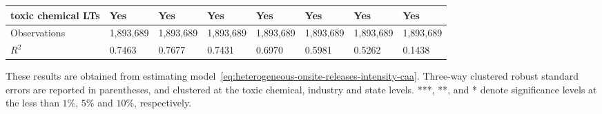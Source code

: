 \begin{table}[H]
{\begin{tabular}{@{}llllllll@{}}
            toxic chemical LTs              & Yes       & Yes           & Yes       & Yes          & Yes             & Yes           & Yes                 \\\midrule\midrule
            Observations                    & 1,893,689 & 1,893,689     & 1,893,689 & 1,893,689    & 1,893,689       & 1,893,689     & 1,893,689           \\
            $R^2$                           & 0.7463    & 0.7677        & 0.7431    & 0.6970       & 0.5981          & 0.5262        & 0.1438              \\ \bottomrule\bottomrule
        \end{tabular}%
    }
    \begin{minipage}{18cm}
        \vspace{0.05in}
        These results are obtained from estimating model~\ref{eq:heterogeneous-onsite-releases-intensity-caa}. Three-way clustered robust standard errors are reported in parentheses, and clustered at the toxic chemical, industry and state levels. ***, **, and * denote significance levels at the less than $1\%$, $5\%$ and $10\%$, respectively.
    \end{minipage}
\end{table}